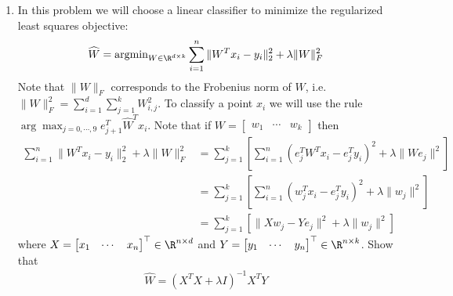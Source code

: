 \documentclass{article}
\begin{document}
\begin{aprob}
    \begin{enumerate}
        \item {} In this problem we will choose a linear classifier to minimize the regularized least squares objective:
        \begin{align*}
            \widehat{W} = \text{argmin}_{W \in \R^{d \times k}} \sum_{i=1}^{n} \| W^Tx_{i} - y_{i} \|^{2}_{2} + \lambda \|W\|_{F}^{2}
        \end{align*}
        Note that $\|W\|_{F}$ corresponds to the Frobenius norm of $W$, i.e. $\|W\|_{F}^{2} = \sum_{i=1}^d \sum_{j=1}^k W_{i,j}^2$. To classify a point $x_i$ we will use the rule $\arg\max_{j=0,\cdots,9} e_{j+1}^T \widehat{W}^T x_i$. Note that if $W = \begin{bmatrix} w_1 & \cdots & w_k \end{bmatrix}$ then
        \begin{align*}
            \sum_{i=1}^{n} \| W^Tx_{i} - y_{i} \|^{2}_{2} + \lambda \|W\|_{F}^{2} &= \sum_{j=1}^k \left[  \sum_{i=1}^n ( e_j^T W^T x_i - e_j^T y_i)^2 + \lambda \| W e_j \|^2 \right] \\
            &= \sum_{j=1}^k \left[  \sum_{i=1}^n ( w_j^T x_i - e_j^T y_i)^2 + \lambda \| w_j \|^2 \right] \\
            &= \sum_{j=1}^k \left[  \| X w_j - Y e_j\|^2 + \lambda \| w_j \|^2 \right]
        \end{align*}
        where $X = \begin{bmatrix} x_1 & \cdots & x_n \end{bmatrix}^\top \in \R^{n \times d}$ and $Y = \begin{bmatrix} y_1 & \cdots & y_n \end{bmatrix}^\top \in \R^{n \times k}$. Show that
        \begin{align*}
            \widehat{W} = (X^T X + \lambda I)^{-1} X^T Y
        \end{align*} 


\end{enumerate}
\end{aprob}
\end{document}
